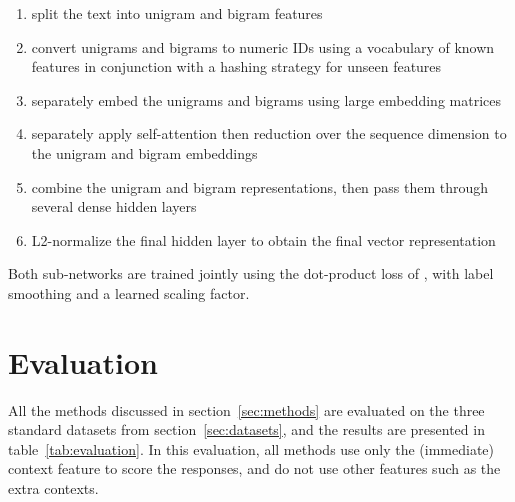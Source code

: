 \documentclass[11pt,a4paper,table]{article}
\begin{document}
\begin{enumerate}
  \setlength\itemsep{0.1em}
    \item split the text into unigram and bigram features
    \item convert unigrams and bigrams to numeric IDs using a vocabulary of known features in conjunction with a hashing strategy for unseen features
    \item separately embed the unigrams and bigrams using large embedding matrices
    \item separately apply self-attention then reduction over the sequence dimension to the unigram and bigram embeddings
    \item combine the unigram and bigram representations, then pass them through several dense hidden layers
    \item L2-normalize the final hidden layer to obtain the final vector representation
\end{enumerate}

Both sub-networks are trained jointly using the dot-product loss of , with label smoothing and a learned scaling factor.

\section{Evaluation} \label{sec:evaluation}

All the methods discussed in section~\ref{sec:methods} are evaluated on the three standard datasets from section~\ref{sec:datasets}, and the results are presented in table~\ref{tab:evaluation}. In this evaluation, all methods use only the (immediate) context feature to score the responses, and do not use other features such as the extra contexts.
\end{document}
